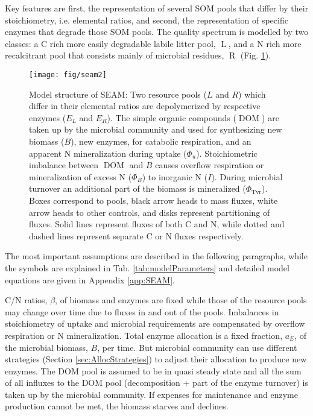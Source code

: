Key features are first, the representation of several SOM pools that differ by
their stoichiometry, i.e. elemental ratios, and second, the representation of
specific enzymes that degrade those SOM pools. The quality spectrum is modelled by two
classes: a C rich more easily degradable labile litter pool,
$\operatorname{L}$, and a N rich more recalcitrant pool that consists
mainly of microbial residues, $\operatorname{R}$ (Fig. \ref{fig:SEAMStruct}).

\begin{figure}[t] \vspace*{2mm}
\begin{center}
\texttt{[image: fig/seam2]}
\end{center}
\caption{
Model structure of SEAM: Two resource pools ($L$ and $R$) which differ in their
elemental ratios are depolymerized by respective enzymes ($E_L$ and $E_R$). The
simple organic compounds ($\operatorname{DOM}$) are taken up by the microbial
community  and used for synthesizing new biomass (${B}$), new enzymes, for
catabolic respiration, and an apparent N mineralization during uptake
($\Phi_u$). Stoichiometric imbalance between $\operatorname{DOM}$ and ${B}$
causes overflow respiration or mineralization of excess N ($\Phi_B$) to
inorganic N ($I$).
During microbial turnover an additional part of the biomass is mineralized
($\Phi_{\operatorname{Tvr}}$).
Boxes correspond to pools, black arrow heads to mass fluxes, white arrow heads
to other controls, and disks represent partitioning of fluxes. Solid lines
represent fluxes of both C and N, while dotted and dashed lines represent
separate C or N fluxes respectively.
\label{fig:SEAMStruct}
}
\end{figure}

The most important assumptions are described in the following paragraphs, while
the symbols are explained in Tab. \ref{tab:modelParameters} and detailed model
equations are given in Appendix \ref{app:SEAM}. 

 

C/N ratios, $\beta$, of biomass and enzymes are
fixed while those of the resource pools may change over time due to
fluxes in and out of the pools. Imbalances in stoichiometry of uptake and
microbial requirements are compensated by overflow respiration or N
mineralization.
Total enzyme allocation is a fixed fraction, $a_E$, of the microbial biomass,
$B$, per time. But microbial community can use different strategies
(Section \ref{sec:AllocStrategies}) to adjust their allocation to produce new
enzymes.  
The DOM pool is assumed to be in quasi steady state and all the sum of all
influxes to the DOM pool (decomposition + part of the enzyme turnover) is taken
up by the microbial community. If expenses for maintenance and enzyme production
cannot be met, the biomass starves and declines.

